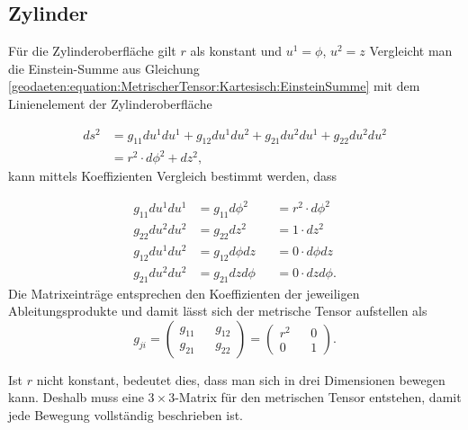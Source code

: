 %
%
%
%
\subsection{Zylinder\label{geodaeten:section:MetrischerTensor:Zylinder}}

Für die Zylinderoberfläche gilt $r$ als konstant und $u^1 = \phi$, $u^2 =z$ 
Vergleicht man die Einstein-Summe aus Gleichung \eqref{geodaeten:equation:MetrischerTensor:Kartesisch:EinsteinSumme} mit dem Linienelement der Zylinderoberfläche

\begin{equation}
	\begin{aligned}
	ds^2 &= g_{11}  du^1  du^1 + g_{12}  du^1  du^2 + g_{21}  du^2  du^1 + g_{22}  du^2  du^2 \\
	&= r^2 \cdot d \phi^2 +dz^2 ,
	\end{aligned}
\end{equation}
kann mittels Koeffizienten Vergleich bestimmt werden, dass 

\begin{equation}
	\begin{alignedat}{3}
		g_{11}  du^1 du^1 &= g_{11}  d \phi^2 & &= r^2 \cdot d \phi^2 \\
		g_{22}  du^2 du^2 &= g_{22}  dz^2    & &= 1 \cdot dz^2 \\
		g_{12}  du^1 du^2 &= g_{12}  d \phi  dz & &= 0 \cdot d \phi  dz \\
		g_{21}  du^2 du^2 &= g_{21}  dz  d \phi & &= 0 \cdot dz  d \phi .
	\end{alignedat}
\end{equation}
Die Matrixeinträge entsprechen den Koeffizienten der jeweiligen Ableitungsprodukte und damit lässt sich der metrische Tensor aufstellen als
\begin{equation}
	g_{ji} =\begin{pmatrix} g_{11} && g_{12} \\ g_{21} && g_{22} \end{pmatrix}= \begin{pmatrix} r^2 && 0 \\ 0 && 1 \end{pmatrix} .
\end{equation}

Ist $r$ nicht konstant, bedeutet dies, dass man sich in drei Dimensionen bewegen kann.
Deshalb muss eine $3 \times 3$-Matrix für den metrischen Tensor entstehen, damit jede Bewegung vollständig beschrieben ist. 

